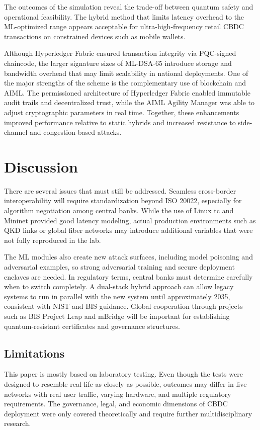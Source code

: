 \documentclass[pdflatex,sn-basic,english]{sn-jnl}
\begin{document}
The outcomes of the simulation reveal the trade-off between quantum safety and operational feasibility. The hybrid method that limits latency overhead to the ML-optimized range appears acceptable for ultra-high-frequency retail CBDC transactions on constrained devices such as mobile wallets.

Although Hyperledger Fabric ensured transaction integrity via PQC-signed chaincode, the larger signature sizes of ML-DSA-65 introduce storage and bandwidth overhead that may limit scalability in national deployments. One of the major strengths of the scheme is the complementary use of blockchain and AIML. The permissioned architecture of Hyperledger Fabric enabled immutable audit trails and decentralized trust, while the AIML Agility Manager was able to adjust cryptographic parameters in real time. Together, these enhancements improved performance relative to static hybrids and increased resistance to side-channel and congestion-based attacks.

\section{Discussion}

There are several issues that must still be addressed. Seamless cross-border interoperability will require standardization beyond ISO 20022, especially for algorithm negotiation among central banks. While the use of Linux tc and Mininet provided good latency modeling, actual production environments such as QKD links or global fiber networks may introduce additional variables that were not fully reproduced in the lab.

The ML modules also create new attack surfaces, including model poisoning and adversarial examples, so strong adversarial training and secure deployment enclaves are needed. In regulatory terms, central banks must determine carefully when to switch completely. A dual-stack hybrid approach can allow legacy systems to run in parallel with the new system until approximately 2035, consistent with NIST and BIS guidance. Global cooperation through projects such as BIS Project Leap and mBridge will be important for establishing quantum-resistant certificates and governance structures.

\subsection{Limitations}

This paper is mostly based on laboratory testing. Even though the tests were designed to resemble real life as closely as possible, outcomes may differ in live networks with real user traffic, varying hardware, and multiple regulatory requirements. The governance, legal, and economic dimensions of CBDC deployment were only covered theoretically and require further multidisciplinary research.
\end{document}
